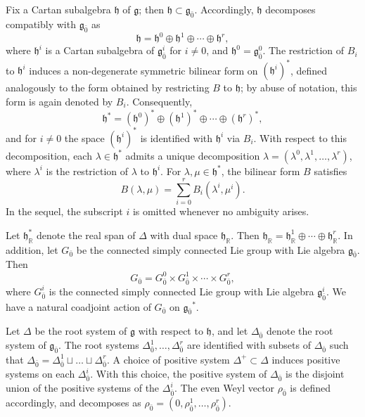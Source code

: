 \documentclass[11pt]{amsart}
\def\RR{{\mathbb R}}
\def\hh{{\mathfrak h}}
\def\even{{\mathfrak{g}_{\bar{0}}}}
\def\gg{{\mathfrak{g}}}
\theoremstyle{plain}
\theoremstyle{remark}
\theoremstyle{definition}
\numberwithin{equation}{section}
\theoremstyle{remark}
\begin{document}
Fix a Cartan subalgebra $\hh$ of $\gg$; then $\hh\subset\even$. Accordingly, $\hh$ decomposes compatibly with $\even$ as
\begin{equation}
\hh=\hh^{0}\oplus\hh^{1}\oplus\cdots\oplus\hh^{r},
\end{equation}
where $\hh^{i}$ is a Cartan subalgebra of $\gg_{\bar 0}^{i}$ for $i\neq 0$, and $\hh^{0}=\gg_{\bar 0}^{0}$. The restriction of $B_{i}$ to $\hh^{i}$ induces a
non-degenerate symmetric bilinear form on $(\hh^{i})^{\ast}$, defined analogously
to the form obtained by restricting $B$ to $\hh$; by abuse of notation, this form
is again denoted by $B_{i}$. Consequently,
\[
\hh^{\ast}=(\hh^{0})^{\ast}\oplus(\hh^{1})^{\ast}\oplus\cdots\oplus(\hh^{r})^{\ast},
\]
and for $i\neq0$ the space $(\hh^{i})^{\ast}$ is identified with $\hh^{i}$ via
$B_{i}$. With respect to this decomposition, each $\lambda\in\hh^{\ast}$ admits a unique decomposition
$\lambda=(\lambda^{0},\lambda^{1},\ldots,\lambda^{r})$, where $\lambda^{i}$ is the
restriction of $\lambda$ to $\hh^{i}$. For $\lambda,\mu\in\hh^{\ast}$, the bilinear
form $B$ satisfies
\begin{equation}
B(\lambda,\mu)=\sum_{i=0}^{r}B_{i}(\lambda^{i},\mu^{i}).
\end{equation}
In the sequel, the subscript $i$ is omitted whenever no ambiguity arises.

Let $\hh_{\RR}^{\ast}$ denote the real span of $\Delta$ with dual space $\hh_{\RR}$.
Then $\hh_{\RR}
=\hh_{\RR}^{1}
\oplus
\cdots
\oplus
\hh_{\RR}^{r}.
$ In addition, let $G_{\bar{0}}$ be the connected simply connected Lie group with Lie algebra $\even$.
Then
\begin{equation}
G_{\bar{0}}
=
G_{\bar{0}}^{0}
\times
G_{\bar{0}}^{1}
\times
\cdots
\times
G_{\bar{0}}^{r},
\end{equation}
where $G_{\bar{0}}^{i}$ is the connected simply connected Lie group with Lie algebra $\gg_{\bar{0}}^{i}$. We have a natural coadjoint action of $G_{\bar{0}}$ on $\even^{\ast}$.

Let $\Delta$ be the root system of $\gg$ with respect to $\hh$, and let $\Delta_{\bar{0}}$ denote the root
system of $\even$.
The root systems $\Delta_{\bar{0}}^{1}, \ldots, \Delta_{\bar{0}}^{r}$ are identified with subsets of $\Delta_{\bar{0}}$ such that $\Delta_{\bar{0}}=\Delta_{\bar{0}}^{1} \sqcup \ldots \sqcup \Delta_{\bar{0}}^{r}$. A choice of positive system $\Delta^{+}\subset\Delta$ induces positive systems on each
$\Delta_{\bar{0}}^{i}$.
With this choice, the positive system of $\Delta_{\bar{0}}$ is the disjoint union of the positive systems of the
$\Delta_{\bar{0}}^{i}$.
The even Weyl vector $\rho_{\bar{0}}$ is defined accordingly, and decomposes as
$
\rho_{\bar{0}}=(0,\rho^{1}_{\bar{0}},\ldots,\rho^{r}_{\bar{0}}).
$
\end{document}
